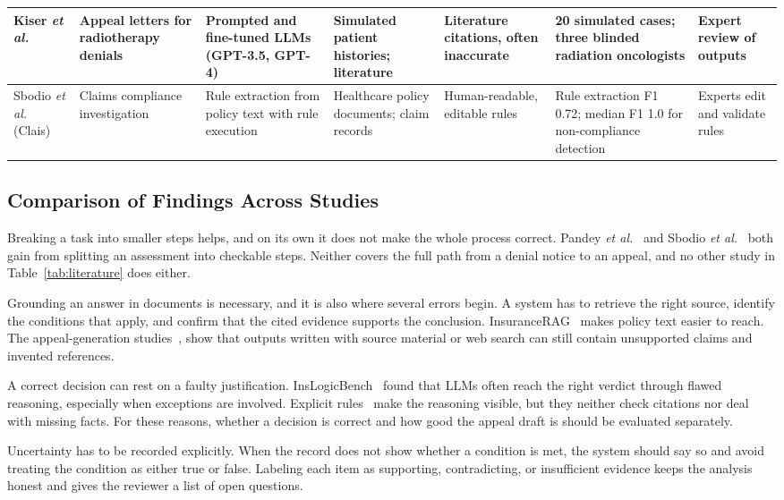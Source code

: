 \documentclass[conference]{IEEEtran}
\begin{document}
\begin{table}[!t]
\begin{tabularx}{\textwidth}{|P{2.2cm}|P{2.3cm}|P{2.3cm}|P{2.6cm}|P{2.6cm}|Y|P{1.5cm}|}
\hline
Kiser \textit{et al.}~\cite{kiser2024} &
Appeal letters for radiotherapy denials &
Prompted and fine-tuned LLMs (GPT-3.5, GPT-4) &
Simulated patient histories; literature &
Literature citations, often inaccurate &
20 simulated cases; three blinded radiation oncologists &
Expert review of outputs \\
\hline
Sbodio \textit{et al.}~\cite{sbodio2024} (Clais) &
Claims compliance investigation &
Rule extraction from policy text with rule execution &
Healthcare policy documents; claim records &
Human-readable, editable rules &
Rule extraction F1 0.72; median F1 1.0 for non-compliance detection &
Experts edit and validate rules \\
\hline
\end{tabularx}
\end{table}

\subsection{Comparison of Findings Across Studies}
Breaking a task into smaller steps helps, and on its own it does not make the whole process correct. Pandey \textit{et al.}~\cite{pandey2024} and Sbodio \textit{et al.}~\cite{sbodio2024} both gain from splitting an assessment into checkable steps. Neither covers the full path from a denial notice to an appeal, and no other study in Table~\ref{tab:literature} does either.

Grounding an answer in documents is necessary, and it is also where several errors begin. A system has to retrieve the right source, identify the conditions that apply, and confirm that the cited evidence supports the conclusion. InsuranceRAG~\cite{hanmante2026} makes policy text easier to reach. The appeal-generation studies~\cite{kiser2024}, \cite{deniedai2026} show that outputs written with source material or web search can still contain unsupported claims and invented references.

A correct decision can rest on a faulty justification. InsLogicBench~\cite{inslogicbench2026} found that LLMs often reach the right verdict through flawed reasoning, especially when exceptions are involved. Explicit rules~\cite{pokharel2026} make the reasoning visible, but they neither check citations nor deal with missing facts. For these reasons, whether a decision is correct and how good the appeal draft is should be evaluated separately.

Uncertainty has to be recorded explicitly. When the record does not show whether a condition is met, the system should say so and avoid treating the condition as either true or false. Labeling each item as supporting, contradicting, or insufficient evidence keeps the analysis honest and gives the reviewer a list of open questions.
\end{document}
